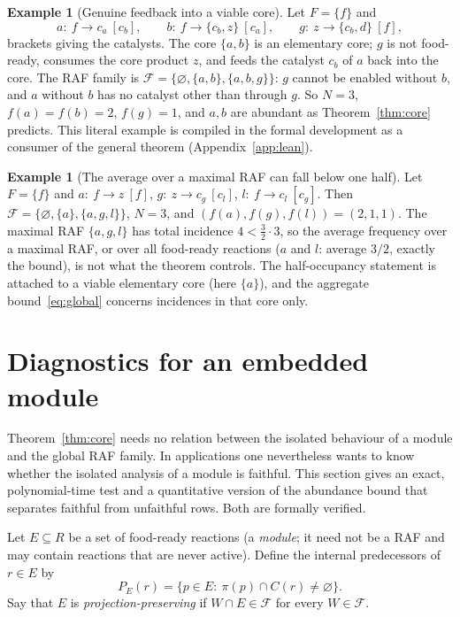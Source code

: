 \documentclass[11pt,a4paper]{article}
\theoremstyle{plain}
\theoremstyle{definition}
\newtheorem{example}[theorem]{Example}
\theoremstyle{remark}
\newcommand{\FF}{\mathcal F}
\begin{document}
\begin{example}[Genuine feedback into a viable core]\label{ex:feedback}
Let $F=\{f\}$ and
\[
a:\ f\to c_a\ [c_b],\qquad b:\ f\to \{c_b,z\}\ [c_a],\qquad g:\ z\to\{c_b,d\}\ [f],
\]
brackets giving the catalysts. The core $\{a,b\}$ is an elementary core; $g$ is not
food-ready, consumes the core product $z$, and feeds the catalyst $c_b$ of $a$ back into the
core. The RAF family is $\FF=\{\varnothing,\{a,b\},\{a,b,g\}\}$: $g$ cannot be enabled
without $b$, and $a$ without $b$ has no catalyst other than through $g$. So $N=3$,
$f(a)=f(b)=2$, $f(g)=1$, and $a,b$ are abundant as Theorem~\ref{thm:core} predicts.
This literal example is compiled in the formal development as a consumer of the general
theorem (Appendix~\ref{app:lean}).
\end{example}

\begin{example}[The average over a maximal RAF can fall below one half]\label{ex:false-average}
Let $F=\{f\}$ and $a:\ f\to z\ [f]$, $g:\ z\to c_g\ [c_l]$, $l:\ f\to c_l\ [c_g]$. Then
$\FF=\{\varnothing,\{a\},\{a,g,l\}\}$, $N=3$, and $(f(a),f(g),f(l))=(2,1,1)$. The maximal RAF
$\{a,g,l\}$ has total incidence $4<\tfrac32\cdot3$, so the average frequency over a maximal
RAF, or over all food-ready reactions ($a$ and $l$: average $3/2$, exactly the bound), is not
what the theorem controls. The half-occupancy statement is attached to a viable elementary
core (here $\{a\}$), and the aggregate bound~\eqref{eq:global} concerns incidences in that
core only.
\end{example}

\section{Diagnostics for an embedded module}\label{sec:diagnostics}

Theorem~\ref{thm:core} needs no relation between the isolated behaviour of a module and the
global RAF family. In applications one nevertheless wants to know whether the isolated
analysis of a module is faithful. This section gives an exact, polynomial-time test and a
quantitative version of the abundance bound that separates faithful from unfaithful rows.
Both are formally verified.

Let $E\subseteq R$ be a set of food-ready reactions (a \emph{module}; it need not be a RAF and
may contain reactions that are never active). Define the internal predecessors of $r\in E$ by
\[
P_E(r)=\{p\in E:\ \pi(p)\cap C(r)\neq\varnothing\}.
\]
Say that $E$ is \emph{projection-preserving} if $W\cap E\in\FF$ for every $W\in\FF$.
\end{document}
